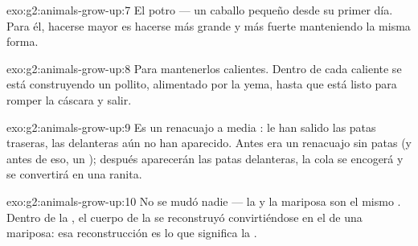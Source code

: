 \begin{solution}{exo:g2:animals-grow-up:7}
El potro --- un caballo pequeño desde su primer día. Para él, hacerse
mayor es hacerse más grande y más fuerte manteniendo la misma forma.
\end{solution}

\begin{solution}{exo:g2:animals-grow-up:8}
Para mantenerlos calientes. Dentro de cada  caliente se está
construyendo un pollito, alimentado por la yema, hasta que está listo
para romper la cáscara y salir.
\end{solution}

\begin{solution}{exo:g2:animals-grow-up:9}
Es un renacuajo a media : le han salido las patas
traseras, las delanteras aún no han aparecido. Antes era un renacuajo
sin patas (y antes de eso, un ); después aparecerán las patas
delanteras, la cola se encogerá y se convertirá en una ranita.
\end{solution}

\begin{solution}{exo:g2:animals-grow-up:10}
No se mudó nadie --- la  y la mariposa son el mismo .
Dentro de la , el cuerpo de la  se reconstruyó
convirtiéndose en el de una mariposa: esa reconstrucción es lo que
significa la .
\end{solution}
